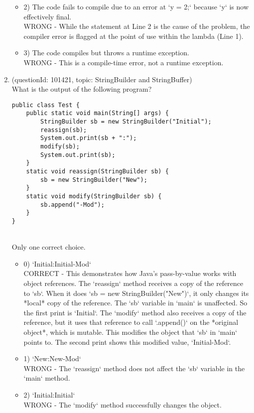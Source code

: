 \documentclass[12pt]{article}
\begin{document}
\begin{enumerate}[label=(\arabic*)]
\begin{itemize}
\item 2) The code fails to compile due to an error at `y = 2;` because `y` is now effectively final.
 \\ 
WRONG - While the statement at Line 2 is the cause of the problem, the compiler error is flagged at the point of use within the lambda (Line 1).

\item 3) The code compiles but throws a runtime exception.
 \\ 
WRONG - This is a compile-time error, not a runtime exception.

\end{itemize}
\item (questionId: 101421, topic: StringBuilder and StringBuffer) \\ 
What is the output of the following program?
\begin{verbatim}
public class Test {
    public static void main(String[] args) {
        StringBuilder sb = new StringBuilder("Initial");
        reassign(sb);
        System.out.print(sb + ":");
        modify(sb);
        System.out.print(sb);
    }
    static void reassign(StringBuilder sb) {
        sb = new StringBuilder("New");
    }
    static void modify(StringBuilder sb) {
        sb.append("-Mod");
    }
}
\end{verbatim}
\\ \noindent Only one correct choice. 
\begin{itemize}
\item 0) `Initial:Initial-Mod`
 \\ 
CORRECT - This demonstrates how Java's pass-by-value works with object references. The `reassign` method receives a copy of the reference to `sb`. When it does `sb = new StringBuilder("New")`, it only changes its *local* copy of the reference. The `sb` variable in `main` is unaffected. So the first print is `Initial`. The `modify` method also receives a copy of the reference, but it uses that reference to call `.append()` on the *original object*, which is mutable. This modifies the object that `sb` in `main` points to. The second print shows this modified value, `Initial-Mod`.

\item 1) `New:New-Mod`
 \\ 
WRONG - The `reassign` method does not affect the `sb` variable in the `main` method.

\item 2) `Initial:Initial`
 \\ 
WRONG - The `modify` method successfully changes the object.


\end{itemize}
\end{enumerate}
\end{document}
